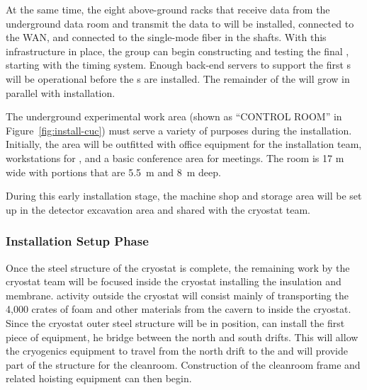 At the same time, the eight above-ground  racks that receive data from the underground data room and  transmit the data to  will %
be installed, connected to the WAN, and connected to the single-mode fiber in the shafts.  With this infrastructure in place, the  group can begin constructing and testing the final  , starting with the %
timing system. %
Enough  back-end servers to support the first s will be operational before the s are installed.  The remainder of the  will grow in parallel with  installation.

The underground experimental work area (shown as ``CONTROL ROOM'' in Figure~\ref{fig:install-cuc}) must serve a variety of purposes during the  installation. Initially, the area will be outfitted with office equipment for the installation team, workstations for , and a basic conference area for meetings. The room is 17 \si{m} wide with portions that are \SI{5.5}{m} and \SI{8}{m} deep.

During this early installation stage, the machine shop and  storage area will %
be set up in the detector excavation area and %
shared with the cryostat team. 

\subsubsection{Installation Setup Phase}
\label{sec:fdsp-tc-inst-setup}

Once the steel structure of the cryostat is complete, the remaining work by the  cryostat team will be focused inside the cryostat installing the insulation and membrane.  
 activity outside the cryostat will %
consist mainly of %
transporting the 4,000 crates of foam and other materials from the cavern to inside the cryostat. %
Since the cryostat outer steel structure will be in position,  can install 
the first piece of equipment, %
he bridge between the north and south drifts. 
This will allow the cryogenics equipment to travel from the north drift to the  and will provide part of the structure for the cleanroom. 
Construction of the cleanroom frame and related hoisting equipment can then begin. 

